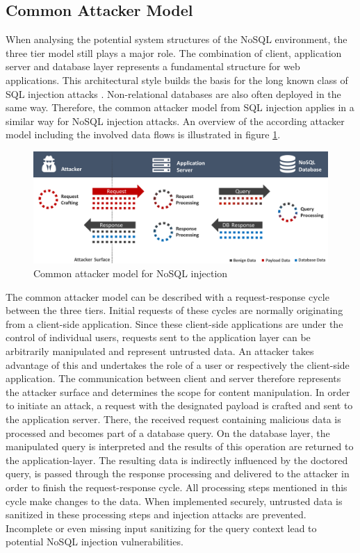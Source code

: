 \subsection{Common Attacker Model}
\label{sec:commonAttackerModel}
When analysing the potential system structures of the NoSQL environment, the three tier model still plays a major role. The combination of client, application server and database layer represents a fundamental structure for web applications. This architectural style builds the basis for the long known class of SQL injection attacks \cite{OWASP:2016}. Non-relational databases are also often deployed in the same way. Therefore, the common attacker model from SQL injection applies in a similar way for NoSQL injection attacks. An overview of the according attacker model including the involved data flows is illustrated in figure \ref{fig:normalAttackerModel}.

\begin{figure}[h]
\centering
  \includegraphics[width=1\linewidth]{Images/attacker_model_normal}
  \caption{Common attacker model for NoSQL injection}
  \label{fig:normalAttackerModel}
\end{figure}

The common attacker model can be described with a request-response cycle between the three tiers. Initial requests of these cycles are normally originating from a client-side application. Since these client-side applications are under the control of individual users, requests sent to the application layer can be arbitrarily manipulated and represent untrusted data. An attacker takes advantage of this and undertakes the role of a user or respectively the client-side application. The communication between client and server therefore represents the attacker surface and determines the scope for content manipulation. In order to initiate an attack, a request with the designated payload is crafted and sent to the application server. There, the received request containing malicious data is processed and becomes part of a database query. On the database layer, the manipulated query is interpreted and the results of this operation are returned to the application-layer. The resulting data is indirectly influenced by the doctored query, is passed through the response processing and delivered to the attacker in order to finish the request-response cycle. All processing steps mentioned in this cycle make changes to the data. When implemented securely, untrusted data is sanitized in these processing steps and injection attacks are prevented. Incomplete or even missing input sanitizing for the query context lead to potential NoSQL injection vulnerabilities.\\

